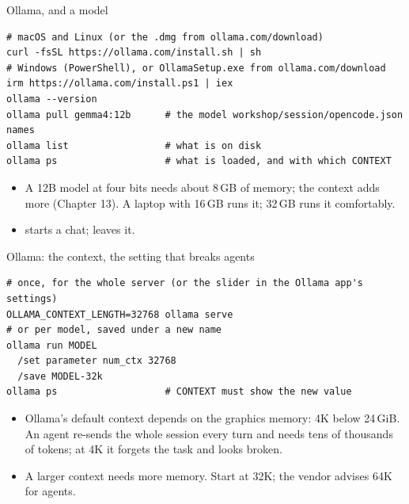 \documentclass[11pt,aspectratio=169]{beamer}
\begin{document}
\begin{frame}[fragile]{Ollama, and a model}
  \begin{lstlisting}[style=shell]
# macOS and Linux (or the .dmg from ollama.com/download)
curl -fsSL https://ollama.com/install.sh | sh
# Windows (PowerShell), or OllamaSetup.exe from ollama.com/download
irm https://ollama.com/install.ps1 | iex
ollama --version
ollama pull gemma4:12b      # the model workshop/session/opencode.json names
ollama list                 # what is on disk
ollama ps                   # what is loaded, and with which CONTEXT
  \end{lstlisting}
  \begin{itemize}
    \item A 12B model at four bits needs about 8\,GB of memory; the context
      adds more (Chapter 13). A laptop with 16\,GB runs it; 32\,GB runs it
      comfortably.
    \item {} starts a chat;  leaves it.
  \end{itemize}
\end{frame}

\begin{frame}[fragile]{Ollama: the context, the setting that breaks agents}
  \begin{lstlisting}[style=shell]
# once, for the whole server (or the slider in the Ollama app's settings)
OLLAMA_CONTEXT_LENGTH=32768 ollama serve
# or per model, saved under a new name
ollama run MODEL
  /set parameter num_ctx 32768
  /save MODEL-32k
ollama ps                   # CONTEXT must show the new value
  \end{lstlisting}
  \begin{itemize}
    \item Ollama's default context depends on the graphics memory: 4K below
      24\,GiB. An agent re-sends the whole session every turn and needs tens
      of thousands of tokens; at 4K it forgets the task and looks broken.
    \item A larger context needs more memory. Start at 32K; the vendor
      advises 64K for agents.
  \end{itemize}
\end{frame}
\end{document}
